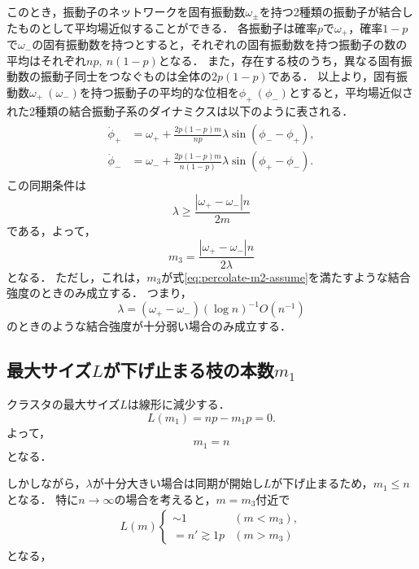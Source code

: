 \documentclass[../main]{subfiles}
\begin{document}
このとき，振動子のネットワークを固有振動数$\omega_\pm$を持つ2種類の振動子が結合したものとして平均場近似することができる．
各振動子は確率$p$で$\omega_+$，確率$1-p$で$\omega_-$の固有振動数を持つとすると，それぞれの固有振動数を持つ振動子の数の平均はそれぞれ$np,\ n(1-p)$となる．
また，存在する枝のうち，異なる固有振動数の振動子同士をつなぐものは全体の$2p(1-p)$である．
以上より，固有振動数$\omega_+\ (\omega_-)$を持つ振動子の平均的な位相を$\phi_+\ (\phi_-)$とすると，平均場近似された2種類の結合振動子系のダイナミクスは以下のように表される．
\begin{align}
    \begin{split}
        \dot{\phi}_+&=\omega_++\frac{2p(1-p)m}{np}\lambda\sin(\phi_--\phi_+),\\
        \dot{\phi}_-&=\omega_-+\frac{2p(1-p)m}{n(1-p)}\lambda\sin(\phi_+-\phi_-).
    \end{split}
\end{align}
この同期条件は
\begin{equation*}
    \lambda\geq \frac{|\omega_+-\omega_-|n}{2m}
\end{equation*}
である，よって，
\begin{equation}
    \label{eq:percolate-m3}
    m_3=\frac{|\omega_+-\omega_-|n}{2\lambda}
\end{equation}
となる．
ただし，これは，$m_3$が式\eqref{eq:percolate-m2-assume}を満たすような結合強度のときのみ成立する．
つまり，
\begin{equation}
    \label{eq:er-meanfield-k}
    \lambda=(\omega_+-\omega_-)(\log n)^{-1}O(n^{-1})
\end{equation}
のときのような結合強度が十分弱い場合のみ成立する．
\subsection{最大サイズ$L$が下げ止まる枝の本数$m_1$}
\label{sec:percolate-m1}
クラスタの最大サイズ$L$は線形に減少する．
\begin{equation}
    L(m_1)=np-m_1p=0.
\end{equation}
よって，
\begin{equation}
    m_1=n
\end{equation}
となる．

しかしながら，$\lambda$が十分大きい場合は同期が開始し$L$が下げ止まるため，$m_1\leq n$となる．
特に$n\to\infty$の場合を考えると，$m=m_3$付近で
\begin{align}
    L(m)
    \begin{cases}
        \sim 1&(m<m_3),\\        
        =n'\gtrsim  1p&(m> m_3)        
    \end{cases}
\end{align}
となる，
\end{document}
